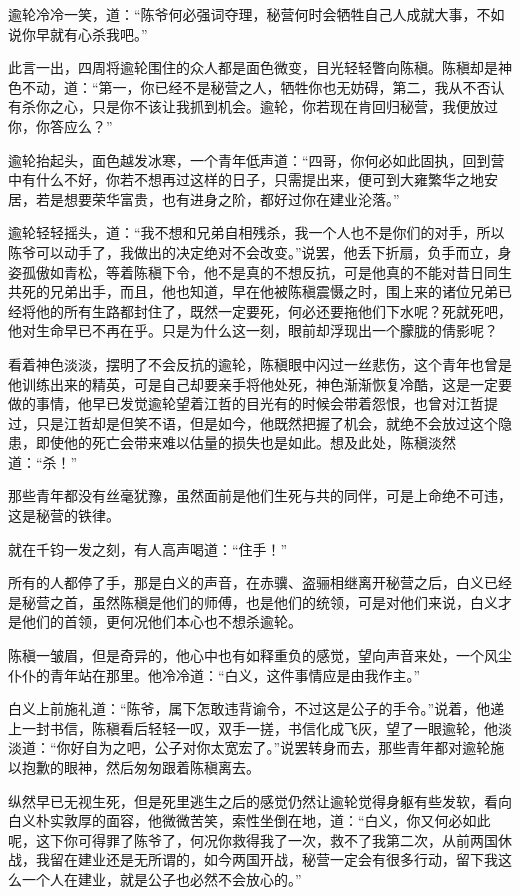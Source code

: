 逾轮冷冷一笑，道：“陈爷何必强词夺理，秘营何时会牺牲自己人成就大事，不如说你早就有心杀我吧。”

此言一出，四周将逾轮围住的众人都是面色微变，目光轻轻瞥向陈稹。陈稹却是神色不动，道：“第一，你已经不是秘营之人，牺牲你也无妨碍，第二，我从不否认有杀你之心，只是你不该让我抓到机会。逾轮，你若现在肯回归秘营，我便放过你，你答应么？”

逾轮抬起头，面色越发冰寒，一个青年低声道：“四哥，你何必如此固执，回到营中有什么不好，你若不想再过这样的日子，只需提出来，便可到大雍繁华之地安居，若是想要荣华富贵，也有进身之阶，都好过你在建业沦落。”

逾轮轻轻摇头，道：“我不想和兄弟自相残杀，我一个人也不是你们的对手，所以陈爷可以动手了，我做出的决定绝对不会改变。”说罢，他丢下折扇，负手而立，身姿孤傲如青松，等着陈稹下令，他不是真的不想反抗，可是他真的不能对昔日同生共死的兄弟出手，而且，他也知道，早在他被陈稹震慑之时，围上来的诸位兄弟已经将他的所有生路都封住了，既然一定要死，何必还要拖他们下水呢？死就死吧，他对生命早已不再在乎。只是为什么这一刻，眼前却浮现出一个朦胧的倩影呢？

看着神色淡淡，摆明了不会反抗的逾轮，陈稹眼中闪过一丝悲伤，这个青年也曾是他训练出来的精英，可是自己却要亲手将他处死，神色渐渐恢复冷酷，这是一定要做的事情，他早已发觉逾轮望着江哲的目光有的时候会带着怨恨，也曾对江哲提过，只是江哲却是但笑不语，但是如今，他既然把握了机会，就绝不会放过这个隐患，即使他的死亡会带来难以估量的损失也是如此。想及此处，陈稹淡然道：“杀！”

那些青年都没有丝毫犹豫，虽然面前是他们生死与共的同伴，可是上命绝不可违，这是秘营的铁律。

就在千钧一发之刻，有人高声喝道：“住手！”

所有的人都停了手，那是白义的声音，在赤骥、盗骊相继离开秘营之后，白义已经是秘营之首，虽然陈稹是他们的师傅，也是他们的统领，可是对他们来说，白义才是他们的首领，更何况他们本心也不想杀逾轮。

陈稹一皱眉，但是奇异的，他心中也有如释重负的感觉，望向声音来处，一个风尘仆仆的青年站在那里。他冷冷道：“白义，这件事情应是由我作主。”

白义上前施礼道：“陈爷，属下怎敢违背谕令，不过这是公子的手令。”说着，他递上一封书信，陈稹看后轻轻一叹，双手一搓，书信化成飞灰，望了一眼逾轮，他淡淡道：“你好自为之吧，公子对你太宽宏了。”说罢转身而去，那些青年都对逾轮施以抱歉的眼神，然后匆匆跟着陈稹离去。

纵然早已无视生死，但是死里逃生之后的感觉仍然让逾轮觉得身躯有些发软，看向白义朴实敦厚的面容，他微微苦笑，索性坐倒在地，道：“白义，你又何必如此呢，这下你可得罪了陈爷了，何况你救得我了一次，救不了我第二次，从前两国休战，我留在建业还是无所谓的，如今两国开战，秘营一定会有很多行动，留下我这么一个人在建业，就是公子也必然不会放心的。”

